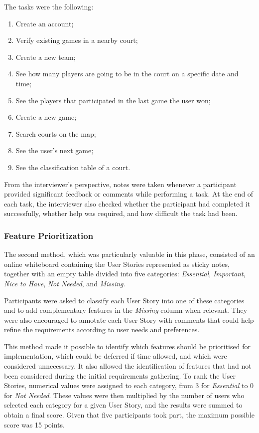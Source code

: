 The tasks were the following:

\begin{enumerate}
	\item Create an account;
	\item Verify existing games in a nearby court;
	\item Create a new team;
	\item See how many players are going to be in the court on a specific date and time;
	\item See the players that participated in the last game the user won;
	\item Create a new game;
	\item Search courts on the map;
	\item See the user's next game;
	\item See the classification table of a court.
\end{enumerate}

From the interviewer’s perspective, notes were taken whenever a participant provided significant feedback or comments while performing a task. At the end of each task, the interviewer also checked whether the participant had completed it successfully, whether help was required, and how difficult the task had been.

\subsubsection{Feature Prioritization}
\label{subsec:method-featPri}

The second method, which was particularly valuable in this phase, consisted of an online whiteboard containing the User Stories represented as sticky notes, together with an empty table divided into five categories: \textit{Essential}, \textit{Important}, \textit{Nice to Have}, \textit{Not Needed}, and \textit{Missing}.

Participants were asked to classify each User Story into one of these categories and to add complementary features in the \textit{Missing} column when relevant. They were also encouraged to annotate each User Story with comments that could help refine the requirements according to user needs and preferences.

This method made it possible to identify which features should be prioritised for implementation, which could be deferred if time allowed, and which were considered unnecessary. 
It also allowed the identification of features that had not been considered during the initial requirements gathering. 
To rank the User Stories, numerical values were assigned to each category, from 3 for \textit{Essential} to 0 for \textit{Not Needed}. These values were then multiplied by the number of users who selected each category for a given User Story, and the results were summed to obtain a final score. 
Given that five participants took part, the maximum possible score was 15 points.

